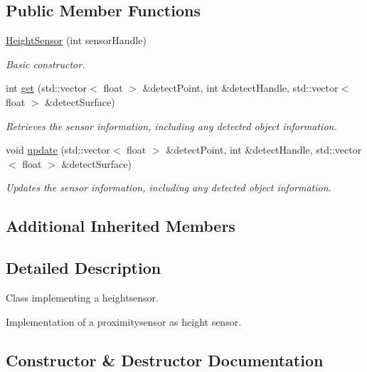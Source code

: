 \subsection*{Public Member Functions}
\begin{DoxyCompactItemize}
\item 
\hyperlink{classHeightSensor_adce900c49d253c6e9cd85db00c2f0708}{Height\+Sensor} (int sensor\+Handle)
\begin{DoxyCompactList}\small\item\em Basic constructor. \end{DoxyCompactList}\item 
int \hyperlink{classHeightSensor_abd4b7d4cc5906a971da402757989f5da}{get} (std\+::vector$<$ float $>$ \&detect\+Point, int \&detect\+Handle, std\+::vector$<$ float $>$ \&detect\+Surface)
\begin{DoxyCompactList}\small\item\em Retrieves the sensor information, including any detected object information. \end{DoxyCompactList}\item 
void \hyperlink{classHeightSensor_ad02d8ea00644637867c61e32745ac43d}{update} (std\+::vector$<$ float $>$ \&detect\+Point, int \&detect\+Handle, std\+::vector$<$ float $>$ \&detect\+Surface)
\begin{DoxyCompactList}\small\item\em Updates the sensor information, including any detected object information. \end{DoxyCompactList}\end{DoxyCompactItemize}
\subsection*{Additional Inherited Members}


\subsection{Detailed Description}
Class implementing a heightsensor. 

Implementation of a proximitysensor as height sensor. 

\subsection{Constructor \& Destructor Documentation}
